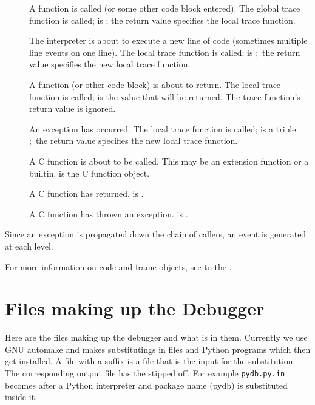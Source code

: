 \begin{description}

\item[]
A function is called (or some other code block entered).  The global
trace function is called;  is ;
the return value specifies the local trace function.

\item[]
The interpreter is about to execute a new line of code (sometimes
multiple line events on one line).  The local trace function is
called;  is ;\ the return value specifies the new
local trace function.

\item[]
A function (or other code block) is about to return.  The local trace
function is called;  is the value that will be returned.  The
trace function's return value is ignored.

\item[]
An exception has occurred.  The local trace function is called;
 is a triple ;\ the return value specifies the new local trace
function.

\item[]
A C function is about to be called.  This may be an extension function
or a builtin.   is the C function object.

\item[]
A C function has returned.  is .

\item[]
A C function has thrown an exception.   is .

\end{description}

Since an exception is propagated down the chain of callers, an
 event is generated at each level.

For more information on code and frame objects, see to the
.

\section{Files making up the Debugger \label{debugger-files}}

Here are the files making up the debugger and what is in
them. Currently we use GNU automake and makes substitutings in files
and Python programs which then get installed. A file with a 
suffix is a file that is the input for the substitution. The
corresponding output file has the  stipped off. For example
{\tt pydb.py.in} becomes  after a Python interpreter and
package name (pydb) is substituted inside it.

